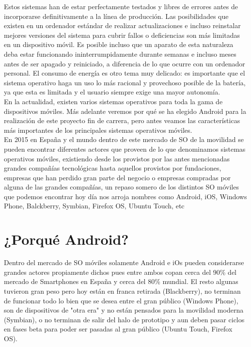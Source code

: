 \documentclass[../pfc.tex]{subfiles}
\begin{document}
	Estos sistemas han de estar perfectamente testados y libres de errores antes de incorporarse definitivamente a la línea de producción. Las posibilidades que existen en un ordenador estándar de realizar actualizaciones e incluso reinstalar mejores versiones del sistema para cubrir fallos o deficiencias son más limitadas en un dispositivo móvil.
	Es posible incluso que un aparato de esta naturaleza deba estar funcionando ininterrumpidamente durante semanas e incluso meses antes de ser apagado y reiniciado, a diferencia de lo que ocurre con un ordenador personal. El consumo de energía es otro tema muy delicado: es importante que el sistema operativo haga un uso lo más racional y provechoso posible de la batería, ya que esta es limitada y el usuario siempre exige una mayor autonomía.\\
	
	En la actualidad, existen varios sistemas operativos para toda la gama de dispositivos móviles. Más adelante veremos por qué se ha elegido Android para la realización de este proyecto fin de carrera, pero antes veamos las características más importantes de los principales sistemas operativos móviles.\\
	
	En 2015 en España y el mundo dentro de este mercado de SO de la movilidad se pueden encontrar diferentes actores que proveen de lo que denominamos sistemas operativos móviles, existiendo desde los provistos por las antes mencionadas grandes compañías tecnológicas hasta aquellos provistos por fundaciones, empresas que han perdido gran parte del negocio o empresas compradas por alguna de las grandes compañías, un repaso somero de los distintos SO móviles que podemos encontrar hoy día nos arroja nombres como Android, iOS, Windows Phone, Balckberry, Symbian, Firefox OS, Ubuntu Touch, etc
		
	\section{¿Porqué Android?}
	Dentro del mercado de SO móviles solamente Android e iOs pueden considerarse grandes actores propiamente dichos pues entre ambos copan cerca del 90\% del mercado de Smartphones en España y cerca del 80\% mundial. El resto algunas tuvieron gran peso pero hoy están en franca retirada (Blackberry), no terminan de funcionar todo lo bien que se desea entre el gran público (Windows Phone), son de dispositivos de "otra era" y no están pensados para la movilidad moderna (Symbian), o no terminan de salir del halo de prototipo y aun deben pasar ciclos en fases beta para  poder ser pasadas al gran público (Ubuntu Touch, Firefox OS).\\
	
\end{document}
